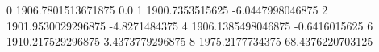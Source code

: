 0 1906.7801513671875 0.0
1 1900.7353515625 -6.0447998046875
2 1901.9530029296875 -4.8271484375
4 1906.1385498046875 -0.6416015625
6 1910.217529296875 3.4373779296875
8 1975.2177734375 68.4376220703125
